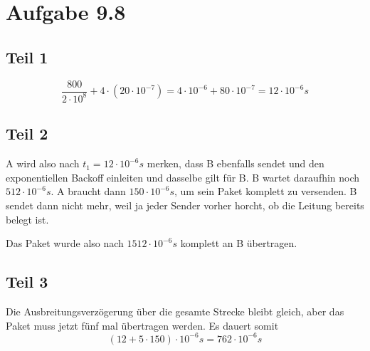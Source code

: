 \documentclass[10pt,a4paper]{article}
\begin{document}
\section{Aufgabe 9.8}

\subsection{Teil 1}

\begin{equation}
  \frac{800}{2 \cdot 10^{8}} + 4 \cdot (20 \cdot 10^{-7}) = 4 \cdot 10^{-6} + 80 \cdot 10^{-7} = 12 \cdot 10^{-6}s
\end{equation}

\subsection{Teil 2}

A wird also nach $t_{1} = 12 \cdot 10^{-6}s$ merken, dass B ebenfalls sendet und
den exponentiellen Backoff einleiten und dasselbe gilt für B. B wartet daraufhin
noch $512 \cdot 10^{-6}s$. A braucht dann $150 \cdot 10^{-6}s$, um sein Paket
komplett zu versenden. B sendet dann nicht mehr, weil ja jeder Sender vorher
horcht, ob die Leitung bereits belegt ist.

Das Paket wurde also nach $1512 \cdot 10^{-6}s$ komplett an B übertragen.

\subsection{Teil 3}

Die Ausbreitungsverzögerung über die gesamte Strecke bleibt gleich, aber das
Paket muss jetzt fünf mal übertragen werden. Es dauert somit
\begin{equation}
  (12 + 5 \cdot 150) \cdot 10^{-6}s = 762 \cdot 10^{-6}s
\end{equation}
\end{document}
